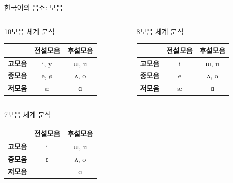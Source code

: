 \documentclass[11pt, aspectratio=169]{beamer}
\newcommand{\textds}[1]{{\ipafont #1}}
\begin{document}
\begin{frame}[t]{한국어의 음소: 모음}
    \begin{columns}
        \begin{column}{0.46\textwidth}
            10모음 체계 분석\\
            \begin{tabular}{ccc}
                \hline
                & \textbf{전설모음} & \textbf{후설모음} \\
                \hline
                \textbf{고모음} & \textds{i}, \textds{y} & \textds{ɯ}, \textds{u}\\
                \textbf{중모음} & \textds{e}, \textds{ø} & \textds{ʌ}, \textds{o} \\ 
                \textbf{저모음} & \textds{æ} & \textds{ɑ} \\
                \hline               
            \end{tabular}
        \end{column}
        \begin{column}{0.47\textwidth}
            8모음 체계 분석\\
            \begin{tabular}{ccc}
                \hline
                & \textbf{전설모음} & \textbf{후설모음} \\
                \hline
                \textbf{고모음} & \textds{i} & \textds{ɯ}, \textds{u}\\
                \textbf{중모음} & \textds{e} & \textds{ʌ}, \textds{o} \\ 
                \textbf{저모음} & \textds{æ} & \textds{ɑ} \\
                \hline               
            \end{tabular}            
        \end{column}
    \end{columns}
    \vfill
    7모음 체계 분석\\
    \begin{tabular}{ccc}
        \hline
        & \textbf{전설모음} & \textbf{후설모음} \\
        \hline
        \textbf{고모음} & \textds{i} & \textds{ɯ}, \textds{u}\\
        \textbf{중모음} & \textds{ɛ} & \textds{ʌ}, \textds{o} \\ 
        \textbf{저모음} &  & \textds{ɑ} \\
        \hline               
    \end{tabular}            

\end{frame}
\end{document}
